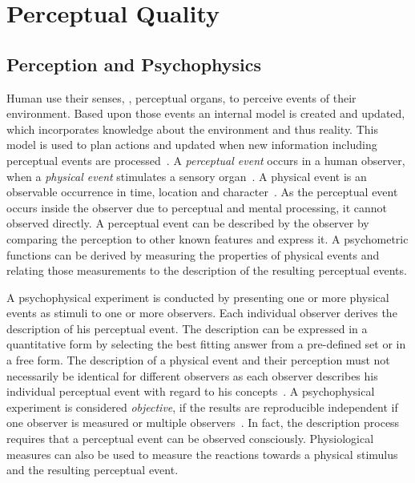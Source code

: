 \section{Perceptual Quality}
\subsection{Perception and Psychophysics}
Human use their senses, \ie, perceptual organs, to perceive events of their environment.
Based upon those events an internal model is created and updated, which incorporates knowledge about the environment and thus reality.
This model is used to plan actions and updated when new information including perceptual events are processed~\citep[p. 4]{blauert_spatial_1996}.
A \emph{perceptual event} occurs in a human observer, when a \emph{physical event} stimulates a sensory organ~\citep{blauert_spatial_1996}.
A physical event is an observable occurrence in time, location and character~\citep{callet_qualinet_2013}.
As the perceptual event occurs inside the observer due to perceptual and mental processing, it cannot observed directly.
A perceptual event can be described by the observer by comparing the perception to other known features and express it.
A psychometric functions can be derived by measuring the properties of physical events and relating those measurements to the description of the resulting perceptual events.

A psychophysical experiment is conducted by presenting one or more physical events as stimuli to one or more observers.
Each individual observer derives the description of his perceptual event.
The description can be expressed in a quantitative form by selecting the best fitting answer from a pre-defined set or in a free form.
The description of a physical event and their perception must not necessarily be identical for different observers as each observer describes his individual perceptual event with regard to his concepts~\citep[p. 11]{blauert_spatial_1996}.
A psychophysical experiment is considered \emph{objective}, if the results are reproducible independent if one observer is measured or multiple observers~\citep[p. 11]{blauert_spatial_1996}.
In fact, the description process requires that a perceptual event can be observed consciously.
Physiological measures can also be used to measure the reactions towards a physical stimulus and the resulting perceptual event.

